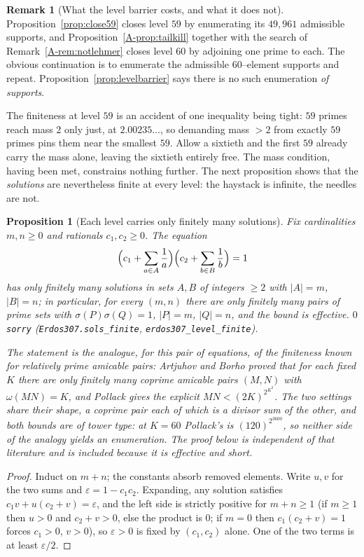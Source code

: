 \documentclass[11pt]{article}
\newtheorem{proposition}[theorem]{Proposition}
\theoremstyle{definition}
\newtheorem{remark}[theorem]{Remark}
\begin{document}
\begin{remark}[What the level barrier costs, and what it does not]\label{rem:levelbarrier}
Proposition~\ref{prop:close59} closes level $59$ by enumerating its $49{,}961$ admissible supports,
and Proposition~\ref{A-prop:tailkill} together with the search of Remark~\ref{A-rem:notlehmer} closes
level $60$ by adjoining one prime to each. The obvious continuation is to enumerate the admissible
$60$--element supports and repeat. Proposition~\ref{prop:levelbarrier} says there is no such
enumeration \emph{of supports}.

The finiteness at level $59$ is an accident of one inequality being tight: $59$ primes reach mass $2$
only just, at $2.00235\ldots$, so demanding mass $>2$ from exactly $59$ primes pins them near the
smallest $59$. Allow a sixtieth and the first $59$ already carry the mass alone, leaving the sixtieth
entirely free. The mass condition, having been met, constrains nothing further. The next proposition
shows that the \emph{solutions} are nevertheless finite at every level: the haystack is infinite, the
needles are not.

\begin{proposition}[Each level carries only finitely many solutions]\label{prop:levelfinite}
Fix cardinalities $m,n\ge0$ and rationals $c_1,c_2\ge0$. The equation
\[ \Bigl(c_1+\sum_{a\in A}\frac1a\Bigr)\Bigl(c_2+\sum_{b\in B}\frac1b\Bigr)=1 \]
has only finitely many solutions in sets $A,B$ of integers $\ge2$ with $|A|=m$, $|B|=n$; in
particular, for every $(m,n)$ there are only finitely many pairs of prime sets with
$\sigma(P)\sigma(Q)=1$, $|P|=m$, $|Q|=n$, and the bound is effective. $0$ \texttt{sorry}
\textup{(\texttt{Erdos307.sols\_finite}, \texttt{erdos307\_level\_finite})}.

The statement is the analogue, for this pair of equations, of the finiteness known for relatively
prime amicable pairs: Artjuhov and Borho proved that for each fixed $K$ there are only finitely many
coprime amicable pairs $(M,N)$ with $\omega(MN)=K$, and Pollack \cite{Pollack2018} gives the
explicit $MN<(2K)^{2^{K^2}}$. The two settings share their shape, a coprime pair each of which is a
divisor sum of the other, and both bounds are of tower type: at $K=60$ Pollack's is
$(120)^{2^{3600}}$, so neither side of the analogy yields an enumeration. The proof below is
independent of that literature and is included because it is effective and short.
\end{proposition}
\begin{proof}
Induct on $m+n$; the constants absorb removed elements. Write $u,v$ for the two sums and
$\varepsilon=1-c_1c_2$. Expanding, any solution satisfies $c_1v+u(c_2+v)=\varepsilon$, and the left
side is strictly positive for $m+n\ge1$ (if $m\ge1$ then $u>0$ and $c_2+v>0$, else the product is
$0$; if $m=0$ then $c_1(c_2+v)=1$ forces $c_1>0$, $v>0$), so $\varepsilon>0$ is fixed by
$(c_1,c_2)$ alone. One of the two terms is at least $\varepsilon/2$.


\end{proof}
\end{remark}
\end{document}
